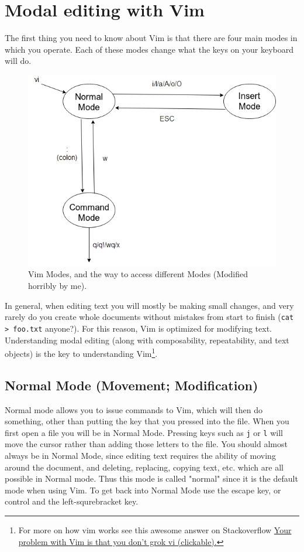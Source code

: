 \documentclass[11pt]{article}
\begin{document}
\section{Modal editing with Vim}
\label{sec:org8d646ad}
The first thing you need to know about Vim is that there are four main modes in
which you operate. Each of these modes change what the keys on your keyboard
will do.

\begin{figure}[htbp]
\centering
\includegraphics[width=.9\linewidth]{./modes.jpg}
\caption{\label{fig:org7433c09}
Vim Modes, and the way to access different Modes (Modified horribly by me).}
\end{figure}

In general, when editing text you will mostly be making small changes, and very
rarely do you create whole documents without mistakes from start to finish (\texttt{cat
> foo.txt} anyone?). For this reason, Vim is optimized for modifying text.
Understanding modal editing (along with composability, repeatability, and text
objects) is the key to understanding Vim\footnote{For more on how vim works see this awesome answer on Stackoverflow
\href{https://stackoverflow.com/questions/1218390/what-is-your-most-productive-shortcut-with-vim}{Your problem with Vim is that you don't grok vi (clickable).}}.
\subsection{Normal Mode (Movement; Modification)}
\label{sec:org108e319}
Normal mode allows you to issue commands to Vim, which will then do something,
other than putting the key that you pressed into the file. When you first open a
file you will be in Normal Mode. Pressing keys such as \texttt{j} or \texttt{l} will move the
cursor rather than adding those letters to the file. You should almost always be
in Normal Mode, since editing text requires the ability of moving around the
document, and deleting, replacing, copying text, etc. which are all possible in
Normal mode. Thus this mode is called "normal" since it is the default mode when
using Vim. To get back into Normal Mode use the escape key, or control and the
left-squrebracket key.
\end{document}
